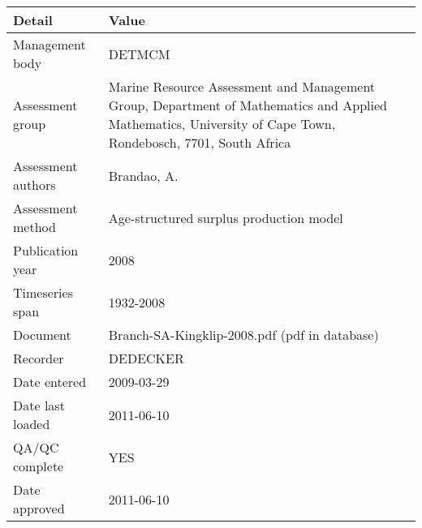\begin{table}[htb]
\centering
\begin{tabular}{lp{7cm}}
\toprule
Detail & Value \\
\midrule
Management body    & DETMCM                                                                                                                                                      \\
Assessment group   & Marine Resource Assessment and Management Group, Department of Mathematics and Applied Mathematics, University of Cape Town, Rondebosch, 7701, South Africa \\
Assessment authors & Brandao, A.                                                                                                                                                 \\
Assessment method  & Age-structured surplus production model                                                                                                                     \\
Publication year   & 2008                                                                                                                                                        \\
Timeseries span    & 1932-2008                                                                                                                                                   \\
Document           & Branch-SA-Kingklip-2008.pdf (pdf in database)                                                                                                               \\
Recorder           & DEDECKER                                                                                                                                                    \\
Date entered       & 2009-03-29                                                                                                                                                  \\
Date last loaded   & 2011-06-10                                                                                                                                                  \\
QA/QC complete     & YES                                                                                                                                                         \\
Date approved      & 2011-06-10                                                                                                                                                  \\
\bottomrule
\end{tabular}
\label{tab:assessdet}
\end{table}
